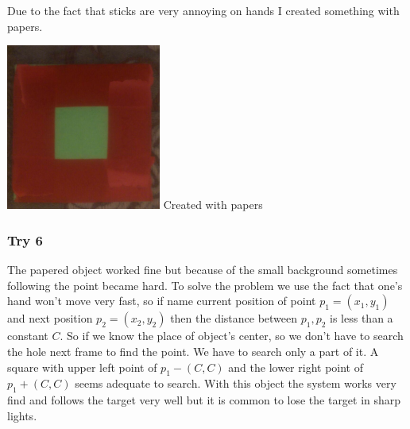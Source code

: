 \documentclass{report}
\begin{document}
Due to the fact that sticks are very annoying on hands I created something with papers.
\begin{center}
	\includegraphics[width=2in]{Object6.jpg} \newline
	\figurename{Created with papers}
\end{center}

\subsubsection{Try 6}
The papered object worked fine but because of the small background sometimes following the point became hard. To solve the problem we use the fact that one's hand won't move very fast, so if name current position of point $p_1 = (x_1, y_1)$ and next position $p_2 = (x_2, y_2)$ then the distance between $p_1, p_2$ is less than a constant $C$. So if we know the place of object's center, so we don't have to search the hole next frame to find the point. We have to search only a part of it. A square with upper left point of $p_1 - (C, C)$ and the lower right point of $p_1 + (C, C)$ seems adequate to search. With this object the system works very find and follows the target very well but it is common to lose the target in sharp lights.
\end{document}
